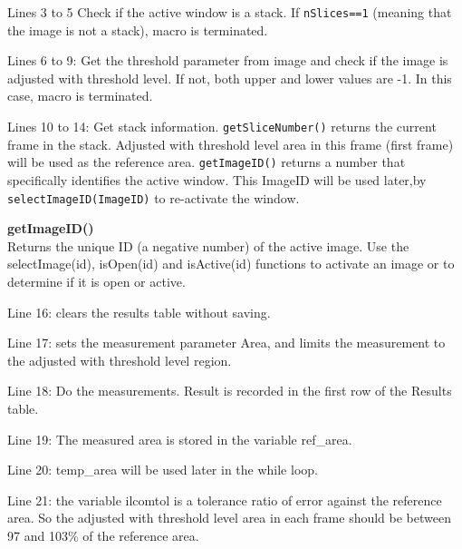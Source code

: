 \documentclass[11pt,a4paper,oneside]{report}
\newenvironment{indentCom}%
{\begin{list}{}%
         {\setlength{\leftmargin}{1em}}%
         \item[]%
}
{\end{list}}
\newcommand{\ilcom}[1]{\texttt{\small#1}}
\begin{document}
\begin{itemize}
\item Lines 3 to 5 Check if the active window is a stack. If \ilcom{nSlices==1} (meaning that the image is not a stack), macro is terminated. 

\item Lines 6 to 9: Get the threshold parameter from image and check if the image is adjusted with threshold level. If not, both upper and lower values are -1. In this case, macro is terminated. 

\item Lines 10 to 14: Get stack information. \ilcom{getSliceNumber()} returns the current frame in the stack. Adjusted with threshold level area in this frame (first frame) will be used as the reference area. \ilcom{getImageID()} returns a number that specifically identifies the active window. This ImageID will be used later,by \ilcom{selectImageID(ImageID)} to re-activate the window. 

\begin{indentCom}
\textbf{getImageID()}\\
Returns the unique ID (a negative number) of the active image. Use the selectImage(id), isOpen(id) and isActive(id) functions to activate an image or to determine if it is open or active. 
\end{indentCom}
\item Line 16: clears the results table without saving. 

\item Line 17: sets the measurement parameter Area, and limits the measurement to the adjusted with threshold level region. 

\item Line 18: Do the measurements. Result is recorded in the first row of the Results table.

\item Line 19: The measured area is stored in the variable ref\_area. 

\item Line 20: temp\_area will be used later in the while loop. 

\item Line 21: the variable ilcom{tol} is a tolerance ratio of error against the reference area. So the adjusted with threshold level area in each frame should be between 97 and 103\% of the reference area. 


\end{itemize}
\end{document}
